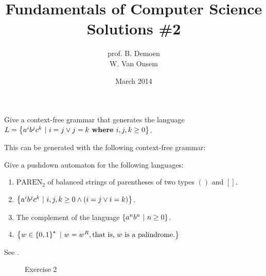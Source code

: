 \documentclass{article}
\title{Fundamentals of Computer Science\\Solutions \#2}
\author{prof. B. Demoen\\W. Van Onsem}
\date{March 2014}
\begin{document}
\maketitle
\begin{exercise}
Give a context-free grammar that generates the language $L=\left\{ a^ib^jc^k\ |\ i=j\vee j=k \mbox{\bf{ where }} i,j,k\geq0 \right\}$.
\begin{answer}This can be generated with the following context-free grammar:
\end{answer}
\end{exercise}

\begin{exercise}
Give a pushdown automaton for the following languages:
\begin{enumerate}
 \item $\mbox{PAREN}_2$ of balanced strings of parentheses of two types $()$ and $[]$.
 \item $\left\{ a^ib^jc^k\ |\ i,j,k\geq0\wedge \left( i=j\vee i=k \right) \right\}$.
 \item The complement of the language $\left\{ a^nb^n\ |\ n\geq 0 \right\}$.
 \item $\left\{ w\in\left\{ 0,1 \right\}^{\star}\ |\ w=w^R, \mbox{that is, $w$ is a palindrome.} \right\}$
\end{enumerate}
\begin{answer}
See .
\begin{figure}[hbt]
\centering
{}
\caption{Exercise 2}
\end{figure}
\end{answer}
\end{exercise}
\end{document}
